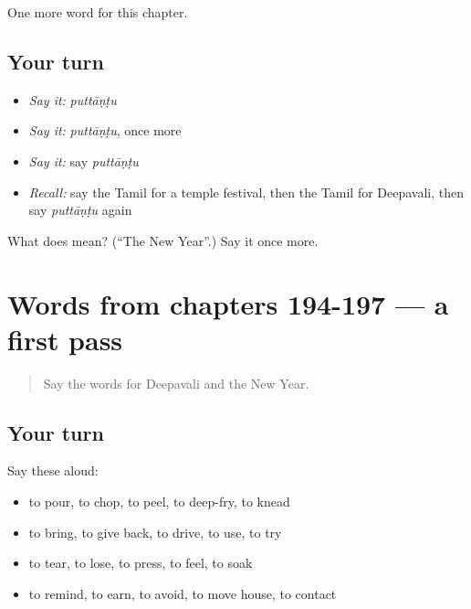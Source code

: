 \begin{grammarlens}[title={What you've built}]
One more word for this chapter.
\end{grammarlens}

\subsection*{Your turn}
\begin{itemize}
\raggedright
  \item \emph{Say it:} \emph{puttāṇṭu}
  \item \emph{Say it:} \emph{puttāṇṭu}, once more
  \item \emph{Say it:} say \emph{puttāṇṭu}
  \item \emph{Recall:} say the Tamil for a temple festival, then the Tamil for Deepavali, then say \emph{puttāṇṭu} again
\end{itemize}

\begin{tcolorbox}[breakable,colback=teal!4,colframe=teal!35!black,title={Before you move on}]
What does  mean? (\textquotedblleft{}The New Year\textquotedblright{}.) Say it once more.
\end{tcolorbox}
\section[(dialogue)]{Words from chapters 194-197 — a first pass}

\label{lesson:TA-R202-first-pass-words-from-chapters-194-197}



\begin{quote}
Say the words for Deepavali and the New Year.
\end{quote}

\subsection*{Your turn}
Say these aloud:

\begin{itemize}
\raggedright
  \item to pour, to chop, to peel, to deep-fry, to knead
  \item to bring, to give back, to drive, to use, to try
  \item to tear, to lose, to press, to feel, to soak
  \item to remind, to earn, to avoid, to move house, to contact
\end{itemize}


